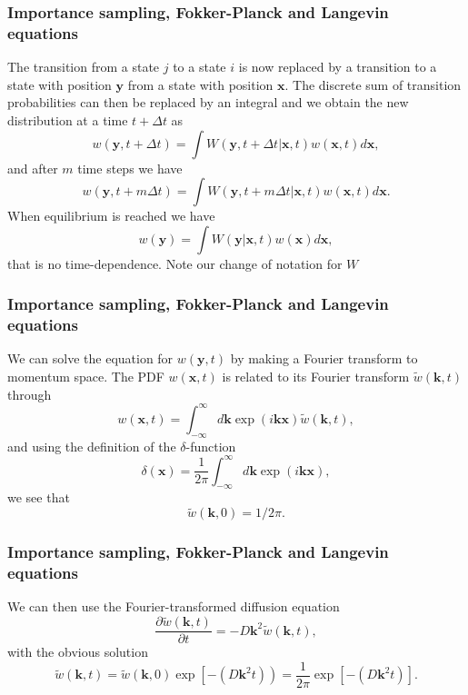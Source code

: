 \documentclass{beamer}
\begin{document}
\begin{frame}
\frametitle{Importance sampling, Fokker-Planck and Langevin equations}

\begin{block}{}
The transition from a state $j$ to a state $i$ is now replaced by a transition
to a state with position $\mathbf{y}$ from a state with position $\mathbf{x}$. 
The discrete sum of transition probabilities can then be replaced by an integral
and we obtain the new distribution at a time $t+\Delta t$ as 
\[
   w(\mathbf{y},t+\Delta t)= \int W(\mathbf{y},t+\Delta t| \mathbf{x},t)w(\mathbf{x},t)d\mathbf{x},
\]
and after $m$ time steps we have
\[
   w(\mathbf{y},t+m\Delta t)= \int W(\mathbf{y},t+m\Delta t| \mathbf{x},t)w(\mathbf{x},t)d\mathbf{x}.
\]
When equilibrium is reached we have
\[
   w(\mathbf{y})= \int W(\mathbf{y}|\mathbf{x}, t)w(\mathbf{x})d\mathbf{x},
\]
that is no time-dependence. Note our change of notation for $W$

\end{block}
\end{frame}

\begin{frame}
\frametitle{Importance sampling, Fokker-Planck and Langevin equations}

\begin{block}{}
We can solve the equation for $w(\mathbf{y},t)$ by making a Fourier transform to
momentum space. 
The PDF $w(\mathbf{x},t)$ is related to its Fourier transform
$\tilde{w}(\mathbf{k},t)$ through
\[
   w(\mathbf{x},t) = \int_{-\infty}^{\infty}d\mathbf{k} \exp{(i\mathbf{kx})}\tilde{w}(\mathbf{k},t),
\]
and using the definition of the 
$\delta$-function 
\[
   \delta(\mathbf{x}) = \frac{1}{2\pi} \int_{-\infty}^{\infty}d\mathbf{k} \exp{(i\mathbf{kx})},
\]
 we see that
\[
   \tilde{w}(\mathbf{k},0)=1/2\pi.
\]
\end{block}
\end{frame}

\begin{frame}
\frametitle{Importance sampling, Fokker-Planck and Langevin equations}

\begin{block}{}
We can then use the Fourier-transformed diffusion equation 
\[
    \frac{\partial \tilde{w}(\mathbf{k},t)}{\partial t} = -D\mathbf{k}^2\tilde{w}(\mathbf{k},t),
\]
with the obvious solution
\[
   \tilde{w}(\mathbf{k},t)=\tilde{w}(\mathbf{k},0)\exp{\left[-(D\mathbf{k}^2t)\right)}=
    \frac{1}{2\pi}\exp{\left[-(D\mathbf{k}^2t)\right]}. 
\]


\end{block}
\end{frame}
\end{document}
